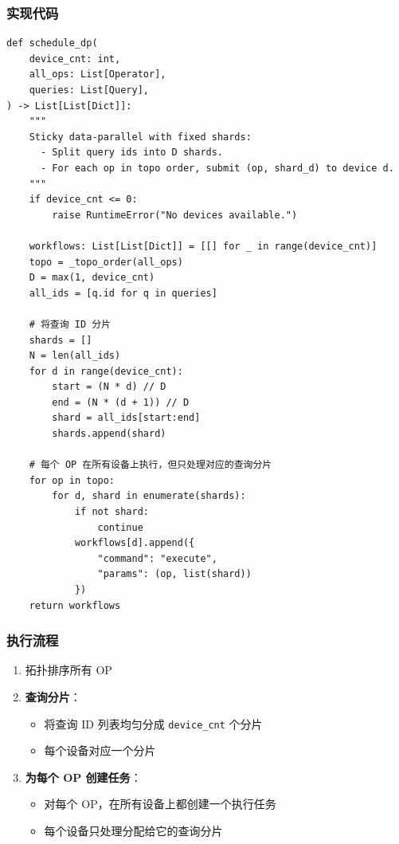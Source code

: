 \documentclass[12pt,a4paper]{article}
\begin{document}
\subsubsection{实现代码}

\begin{lstlisting}
def schedule_dp(
    device_cnt: int,
    all_ops: List[Operator],
    queries: List[Query],
) -> List[List[Dict]]:
    """
    Sticky data-parallel with fixed shards:
      - Split query ids into D shards.
      - For each op in topo order, submit (op, shard_d) to device d.
    """
    if device_cnt <= 0:
        raise RuntimeError("No devices available.")
    
    workflows: List[List[Dict]] = [[] for _ in range(device_cnt)]
    topo = _topo_order(all_ops)
    D = max(1, device_cnt)
    all_ids = [q.id for q in queries]
    
    # 将查询 ID 分片
    shards = []
    N = len(all_ids)
    for d in range(device_cnt):
        start = (N * d) // D
        end = (N * (d + 1)) // D
        shard = all_ids[start:end]
        shards.append(shard)
    
    # 每个 OP 在所有设备上执行，但只处理对应的查询分片
    for op in topo:
        for d, shard in enumerate(shards):
            if not shard:
                continue
            workflows[d].append({
                "command": "execute",
                "params": (op, list(shard))
            })
    return workflows
\end{lstlisting}

\subsubsection{执行流程}

\begin{enumerate}
    \item 拓扑排序所有 OP
    \item \textbf{查询分片}：
    \begin{itemize}
        \item 将查询 ID 列表均匀分成 \texttt{device\_cnt} 个分片
        \item 每个设备对应一个分片
    \end{itemize}
    \item \textbf{为每个 OP 创建任务}：
    \begin{itemize}
        \item 对每个 OP，在所有设备上都创建一个执行任务
        \item 每个设备只处理分配给它的查询分片
    \end{itemize}
\end{enumerate}
\end{document}

